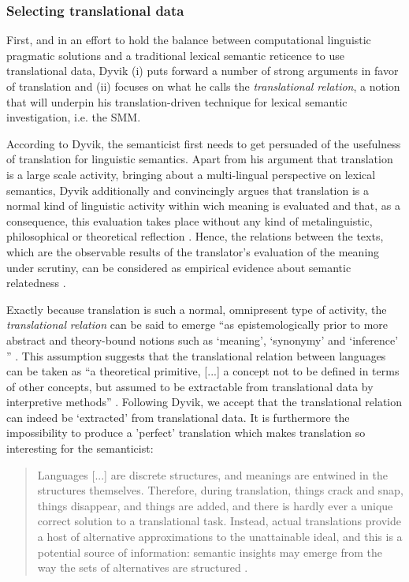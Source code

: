 \subsubsection{\label{sec:2.3.4.1}  Selecting translational data}
First, and in an effort to hold the balance between computational linguistic pragmatic solutions and a traditional lexical semantic reticence to use translational data, Dyvik (i) puts forward a number of strong arguments in favor of translation and (ii) focuses on what he calls the \textit{translational} \textit{relation}, a notion that will underpin his translation-driven technique for lexical semantic investigation, i.e. the SMM.

According to Dyvik, the semanticist first needs to get persuaded of the usefulness of translation for linguistic semantics. Apart from his argument that translation is a large scale activity, bringing about a multi-lingual perspective on lexical semantics, Dyvik additionally and convincingly argues that translation is a normal kind of linguistic activity within wich meaning is evaluated and that, as a consequence, this evaluation takes place without any kind of metalinguistic, philosophical or theoretical reflection \citep[51]{johansson_translational_1998}. Hence, the relations between the texts, which are the observable results of the translator’s evaluation of the meaning under scrutiny, can be considered as empirical evidence about semantic relatedness \citep[51]{johansson_translational_1998}.

Exactly because translation is such a normal, omnipresent type of activity, the \textit{translational} \textit{relation} can be said to emerge “as epistemologically prior to more abstract and theory-bound notions such as ‘meaning’, ‘synonymy’ and ‘inference’ ” \citep[27]{langemets_translations_2005}. This assumption suggests that the translational relation between languages can be taken as “a theoretical primitive, [...] a concept not to be defined in terms of other concepts, but assumed to be extractable from translational data by interpretive methods” \citep[27]{langemets_translations_2005}. Following Dyvik, we accept that the translational relation can indeed be ‘extracted’ from translational data. It is furthermore the impossibility to produce a 'perfect' translation which makes translation so interesting for the semanticist:

\begin{quote}
Languages [...] are discrete structures, and meanings are entwined in the structures themselves. Therefore, during translation, things crack and snap, things disappear, and things are added, and there is hardly ever a unique correct solution to a translational task. Instead, actual translations provide a host of alternative approximations to the unattainable ideal, and this is a potential source of information: semantic insights may emerge from the way the sets of alternatives are structured \citep[28]{langemets_translations_2005}.
\end{quote}


